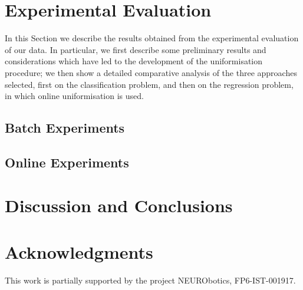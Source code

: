 \documentclass[journal]{IEEEtran}
\begin{document}
\section{Experimental Evaluation}
\label{sec:exp}

In this Section we describe the results obtained from the experimental
evaluation of our data. In particular, we first describe some
preliminary results and considerations which have led to the
development of the uniformisation procedure; we then show a detailed
comparative analysis of the three approaches selected, first on the
classification problem, and then on the regression problem, in which
online uniformisation is used.

\subsection{Batch Experiments}
\label{subsec:strategy}


\subsection{Online Experiments}
\label{subsec:online}


\section{Discussion and Conclusions}
\label{sec:discussion}


\section*{Acknowledgments}

This work is partially supported by the project NEURObotics,
FP6-IST-001917.

{\small


}


\end{document}
